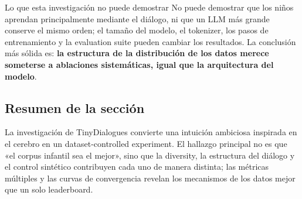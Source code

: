 \begin{warningbox}{Lo que esta investigación no puede demostrar}
No puede demostrar que los niños aprendan principalmente mediante el diálogo, ni que un LLM más grande conserve el mismo orden; el tamaño del modelo, el tokenizer, los pasos de entrenamiento y la evaluation suite pueden cambiar los resultados. La conclusión más sólida es: \textbf{la estructura de la distribución de los datos merece someterse a ablaciones sistemáticas, igual que la arquitectura del modelo}.
\end{warningbox}

\subsection{Resumen de la sección}

La investigación de TinyDialogues convierte una intuición ambiciosa inspirada en el cerebro en un dataset-controlled experiment. El hallazgo principal no es que «el corpus infantil sea el mejor», sino que la diversity, la estructura del diálogo y el control sintético contribuyen cada uno de manera distinta; las métricas múltiples y las curvas de convergencia revelan los mecanismos de los datos mejor que un solo leaderboard.
